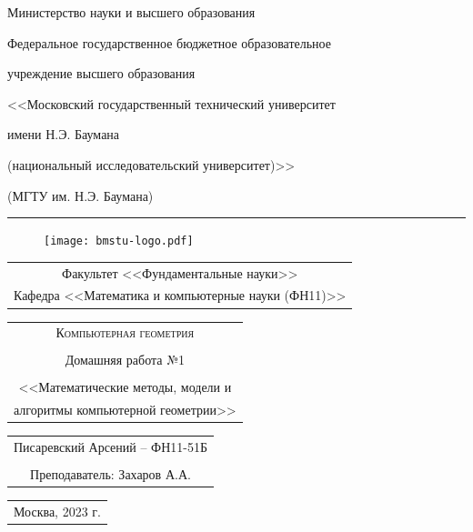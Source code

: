\documentclass{bmstu}
\begin{document}
	
	\pagestyle{empty}
	\centerline{\large Министерство науки и высшего образования}	
	\centerline{\large Федеральное государственное бюджетное образовательное}
	\centerline{\large учреждение высшего образования}
	\centerline{\large <<Московский государственный технический университет}
	\centerline{\large имени Н.Э. Баумана}
	\centerline{\large (национальный исследовательский университет)>>}
	\centerline{\large (МГТУ им. Н.Э. Баумана)}
	\hrule
	\vspace{0.5cm}
	\begin{figure}[h]
		\center
		\texttt{[image: bmstu-logo.pdf]}
	\end{figure}
	\begin{center}
		\large	
		\begin{tabular}{c}
			Факультет <<Фундаментальные науки>> \\
			Кафедра <<Математика и компьютерные науки (ФН11)>>		
		\end{tabular}
	\end{center}
	\vspace{0.5cm}
	\begin{center}
		\LARGE \bf	
		\begin{tabular}{c}
			\textsc{Компьютерная геометрия}
			\\
			\\
			Домашняя работа №1\\ \\
			<<Математические методы, модели и \\
			алгоритмы компьютерной геометрии>> \\
		\end{tabular}
	\end{center}
	\vspace{0.5cm}
	\begin{center}
		\large	
		\begin{tabular}{c}
			Писаревский Арсений -- ФН11-51Б \\ \\
			Преподаватель: Захаров А.А.
		\end{tabular}
	\end{center}
	\vfill
	\begin{center}
		\large	
		\begin{tabular}{c}
			Москва, 
			2023 г.
		\end{tabular}
	\end{center}
	
	
	\newpage
	
\end{document}
